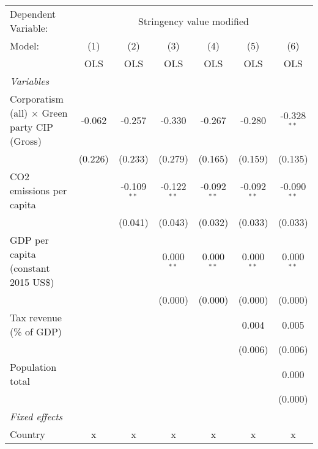 
\begingroup
\centering
\begin{tabular}{lcccccc}
   \toprule
   Dependent Variable: & \multicolumn{6}{c}{Stringency value modified}\\
   Model:                                              & (1)     & (2)           & (3)           & (4)           & (5)           & (6)\\  
                                                       &  OLS    & OLS           & OLS           & OLS           & OLS           & OLS\\  
   \midrule
   \emph{Variables}\\
   Corporatism (all) $\times$ Green party CIP (Gross)  & -0.062  & -0.257        & -0.330        & -0.267        & -0.280        & -0.328$^{**}$\\   
                                                       & (0.226) & (0.233)       & (0.279)       & (0.165)       & (0.159)       & (0.135)\\   
   CO2 emissions per capita                            &         & -0.109$^{**}$ & -0.122$^{**}$ & -0.092$^{**}$ & -0.092$^{**}$ & -0.090$^{**}$\\   
                                                       &         & (0.041)       & (0.043)       & (0.032)       & (0.033)       & (0.033)\\   
   GDP per capita (constant 2015 US\$)                 &         &               & 0.000$^{**}$  & 0.000$^{**}$  & 0.000$^{**}$  & 0.000$^{**}$\\   
                                                       &         &               & (0.000)       & (0.000)       & (0.000)       & (0.000)\\   
   Tax revenue (\% of GDP)                             &         &               &               &               & 0.004         & 0.005\\   
                                                       &         &               &               &               & (0.006)       & (0.006)\\   
   Population total                                    &         &               &               &               &               & 0.000\\   
                                                       &         &               &               &               &               & (0.000)\\   
   \emph{Fixed effects}\\
   Country                                             & x       & x             & x             & x             & x             & x\\  

\end{tabular}
